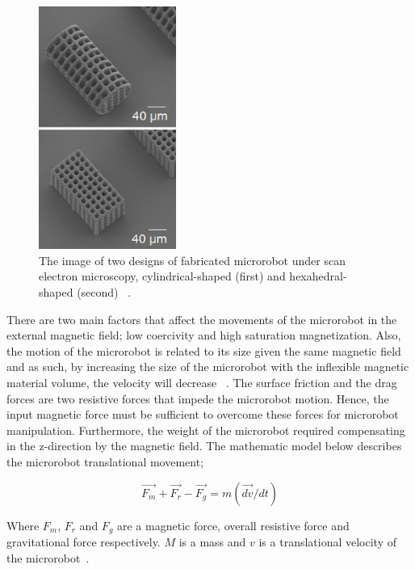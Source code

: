 \documentclass[a4paper,11pt]{article}
\begin{document}
\begin{sloppypar}
\begin{figure}
  \centering
    \includegraphics[width=0.4\textwidth]{4}
  \caption{The image of two designs of fabricated microrobot under scan electron microscopy, cylindrical-shaped (first)
and hexahedral-shaped (second) ~\citep{kim2013fabrication}.}
  \label{ref4}
\end{figure}

There are two main factors that affect the movements of the microrobot in the external magnetic
 field; low coercivity and high saturation magnetization. Also, the motion of the microrobot is related to 
its size given the same magnetic field and as such, by increasing the size of the microrobot with the inflexible magnetic material
 volume, the velocity will decrease ~\citep{kim2013fabrication}. 
The surface friction and the drag forces are two resistive forces that impede the microrobot 
motion. Hence, the input magnetic force must be sufficient to overcome these forces for microrobot 
manipulation. Furthermore, the weight of the microrobot required compensating in the z-direction by 
the magnetic field. The mathematic model below describes the microrobot translational movement;

\begin{equation}
  \overrightarrow{F_m }+ \overrightarrow{F_r} - \overrightarrow{F_g} = m(\overrightarrow{dv}/dt)
\label{eq:4}
\end{equation}

Where $F_m$, $F_r$ and $F_g$ are a magnetic force, overall resistive force and gravitational force respectively. 
$M$ is a mass and $v$ is a translational velocity of the microrobot~\citep{kim2013fabrication}.  


\end{sloppypar}
\end{document}

